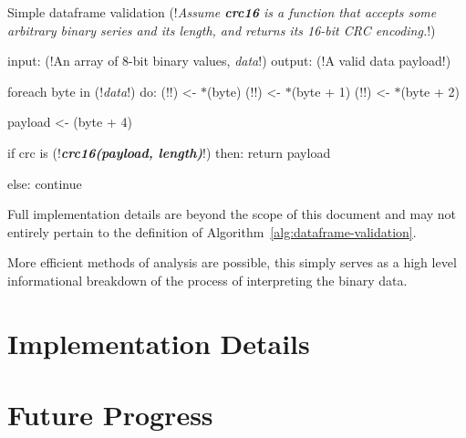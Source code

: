 
\begin{algorithm}{Simple dataframe validation}
(!\textit{Assume \emph{\bfseries crc16} is a function that accepts some arbitrary binary series and its length, and returns its 16-bit CRC encoding.}!)

input:  (!An array of 8-bit binary values, \emph{data}!) 
output: (!A valid data payload!)

foreach byte in (!\emph{data}!) do:
    (!!) <- $\ast$(byte)
    (!!) <- $\ast$(byte + 1)
    (!!) <- $\ast$(byte + 2)

    payload <- (byte + 4)

    if crc is (!\emph{\bfseries crc16(payload, length)}!) then:
        return payload

    else: continue
\end{algorithm}

Full implementation details are beyond the scope of this document and may not entirely pertain to the definition of Algorithm~\ref{alg:dataframe-validation}. 

More efficient methods of analysis are possible, this simply serves as a high level informational breakdown of the process of interpreting the binary data.

\section{Implementation Details}

\section{Future Progress}

